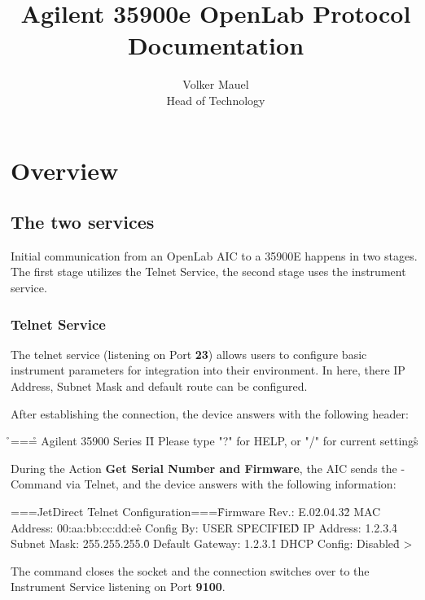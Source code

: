 \documentclass[]{scrartcl}
\begin{document}

	\title{Agilent 35900e OpenLab Protocol Documentation}
	\author{Volker Mauel\\Head of Technology}
	\maketitle
	\clearpage{}
	\section{Overview}

	\subsection{The two services}
	Initial communication from an OpenLab AIC to a 35900E happens in two stages. The first stage utilizes the Telnet Service, the second stage uses the instrument service.
	\subsubsection{Telnet Service}
	The telnet service (listening on Port \textbf{23}) allows users to configure basic instrument parameters for integration into their environment. In here, there IP Address, Subnet Mask and default route can be configured.

After establishing the connection, the device answers with the following header:
\begin{verbatim*}
\r\n===\xff\xfc{}\r\n
Agilent 35900 Series II\r\n
Please type "?" for HELP, or "/" for current settings\r\n
\end{verbatim*}
	During the Action \textbf{Get Serial Number and Firmware}, the AIC sends the \fbox{/}-Command via Telnet, and the device answers with the following information:
\begin{verbatim*}
   ===JetDirect Telnet Configuration===\n\r
Firmware Rev.: E.02.04.32\r\n
MAC Address: 00:aa:bb:cc:dd:ee\r\n
Config By: USER SPECIFIED\r\n\r\n
IP Address: 1.2.3.4\r\n
Subnet Mask: 255.255.255.0\r\n
Default Gateway: 1.2.3.1\r\n
DHCP Config: Disabled\r\n
>
\end{verbatim*}

The  command closes the socket and the connection switches over to the Instrument Service listening on Port \textbf{9100}.
\end{document}

